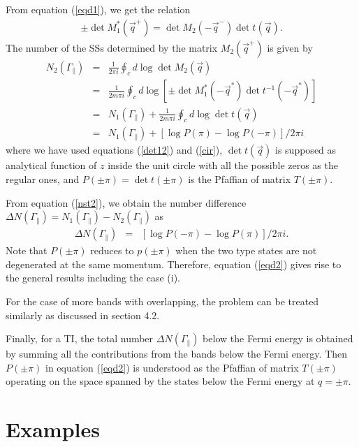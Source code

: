 \documentclass[aps,pra,amsmath,twocolumn,showpacs,bibnotes,10pt]{revtex4-1}
\begin{document}
From equation (\ref{eqd1}), we get the relation 
\begin{eqnarray}
\pm\det M_1^{\ast}(\vec q^+) = \det M_2(-\vec q^-) \det t(\vec q).  \label{det12}
\end{eqnarray}
The number of the SSs determined by the matrix $M_2(\vec q^+)$ is given by
\begin{eqnarray}
N_2(\Gamma_{\parallel}) &=& \frac{1}{2\pi i}\oint_{c}d\log \det M_2(\vec q)  \nonumber\\
&=& \frac{1}{2m\pi i}\oint_{c}d\log [\pm\det M_1^{\ast}(-\vec q^{\ast}) \det t^{-1}(-\vec q^{\ast})]  \nonumber\\
&=& N_1(\Gamma_{\parallel})+\frac{1}{2m\pi i}\oint_{c}d\log\det t(\vec q)  \nonumber\\
&=& N_1(\Gamma_{\parallel})+[\log P(\pi)-\log P(-\pi)]/2\pi i   \label{nst2} 
\end{eqnarray}
where we have used equations (\ref{det12}) and (\ref{cir}), $\det t(\vec q)$ is supposed as analytical function of $z$ inside the unit circle with all the possible zeros as the regular ones, and $P(\pm\pi) = \det t(\pm\pi)$ is the Pfaffian of matrix $T(\pm\pi)$. 

From equation (\ref{nst2}), we obtain the number difference $\Delta N(\Gamma_{\parallel})=N_1(\Gamma_{\parallel})-N_2(\Gamma_{\parallel})$ as
\begin{eqnarray}
\Delta N(\Gamma_{\parallel}) &=& [\log P(-\pi)-\log P(\pi)]/2\pi i.         \label{eqd2}
\end{eqnarray}
Note that $P(\pm\pi)$ reduces to $p(\pm\pi)$ when the two type states are not degenerated at the same momentum. Therefore, equation (\ref{eqd2}) gives rise to the general results including the case (i).

For the case of more bands with overlapping, the problem can be treated similarly as discussed in section 4.2.

Finally, for a TI, the total number $\Delta N(\Gamma_{\parallel})$ below the Fermi energy is obtained by summing all the contributions from the bands below the Fermi energy. Then $P(\pm\pi)$ in equation (\ref{eqd2}) is understood as the Pfaffian of matrix $T(\pm\pi)$ operating on the space spanned by the states below the Fermi energy at $q = \pm\pi$. 

\section{Examples}
\renewcommand{\theequation}{E\arabic{equation}}
\setcounter{equation}{0}
\end{document}
